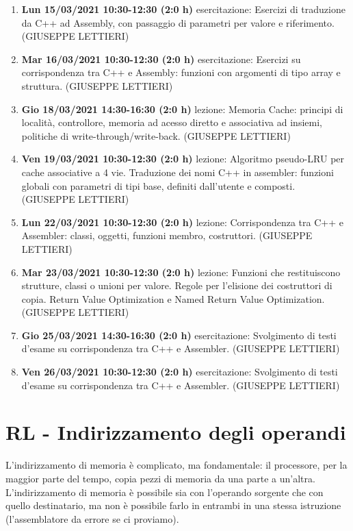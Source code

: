 \documentclass[11pt]{report}
\theoremstyle{definition}
\begin{document}
\begin{enumerate}
\item \textbf{Lun 15/03/2021 10:30-12:30 (2:0 h)} esercitazione: Esercizi di traduzione da C++ ad Assembly, con passaggio di parametri per valore e riferimento. (GIUSEPPE LETTIERI)
	\item \textbf{Mar 16/03/2021 10:30-12:30 (2:0 h)} esercitazione: Esercizi su corrispondenza tra C++ e Assembly: funzioni con argomenti di tipo array e struttura. (GIUSEPPE LETTIERI)
	\item \textbf{Gio 18/03/2021 14:30-16:30 (2:0 h)} lezione: Memoria Cache: principi di località, controllore, memoria ad acesso diretto e associativa ad insiemi, politiche di write-through/write-back. (GIUSEPPE LETTIERI)
	\item \textbf{Ven 19/03/2021 10:30-12:30 (2:0 h)} lezione: Algoritmo pseudo-LRU per cache associative a 4 vie. Traduzione dei nomi C++ in assembler: funzioni globali con parametri di tipi base, definiti dall'utente e composti. (GIUSEPPE LETTIERI)
	\item \textbf{Lun 22/03/2021 10:30-12:30 (2:0 h)} lezione: Corrispondenza tra C++ e Assembler: classi, oggetti, funzioni membro, costruttori. (GIUSEPPE LETTIERI)
	\item \textbf{Mar 23/03/2021 10:30-12:30 (2:0 h)} lezione: Funzioni che restituiscono strutture, classi o unioni per valore. Regole per l'elisione dei costruttori di copia. Return Value Optimization e Named Return Value Optimization. (GIUSEPPE LETTIERI)
	\item \textbf{Gio 25/03/2021 14:30-16:30 (2:0 h)} esercitazione: Svolgimento di testi d'esame su corrispondenza tra C++ e Assembler. (GIUSEPPE LETTIERI)
	\item \textbf{Ven 26/03/2021 10:30-12:30 (2:0 h)} esercitazione: Svolgimento di testi d'esame su corrispondenza tra C++ e Assembler. (GIUSEPPE LETTIERI)
\end{enumerate}
\normalsize 

 
 \chapter{RL - Indirizzamento degli operandi}
 L'indirizzamento di memoria è complicato, ma fondamentale: il processore, per la maggior parte del tempo, copia pezzi di memoria da una parte a un'altra. L'indirizzamento di memoria è possibile sia con l'operando sorgente che con quello destinatario, ma non è possibile farlo in entrambi in una stessa istruzione (l'assemblatore da errore se ci proviamo). 
\end{document}
